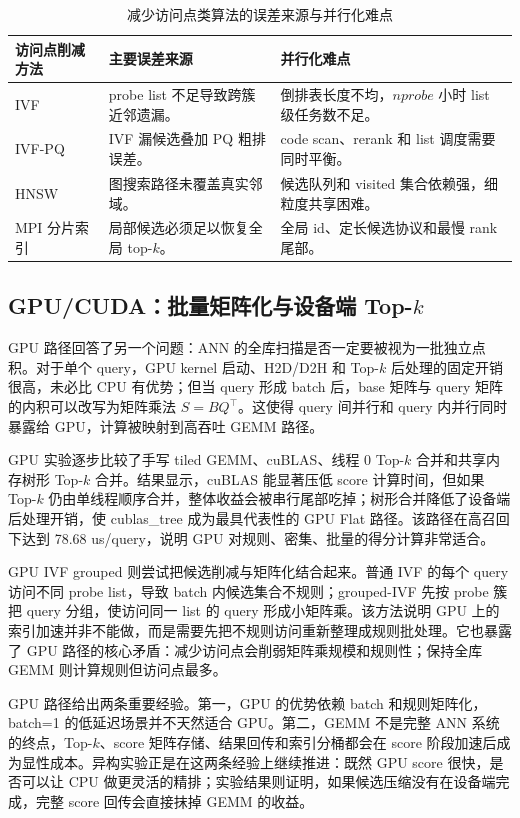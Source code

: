 \documentclass[a4paper,11pt,UTF8]{ctexart}
\begin{document}
\begin{table}[H]
  \centering\footnotesize
  \begin{tabularx}{\textwidth}{p{2.8cm}p{3.8cm}Y}
    \toprule
    访问点削减方法 & 主要误差来源 & 并行化难点 \\
    \midrule
    IVF & probe list 不足导致跨簇近邻遗漏。 & 倒排表长度不均，$nprobe$ 小时 list 级任务数不足。 \\
    IVF-PQ & IVF 漏候选叠加 PQ 粗排误差。 & code scan、rerank 和 list 调度需要同时平衡。 \\
    HNSW & 图搜索路径未覆盖真实邻域。 & 候选队列和 visited 集合依赖强，细粒度共享困难。 \\
    MPI 分片索引 & 局部候选必须足以恢复全局 top-$k$。 & 全局 id、定长候选协议和最慢 rank 尾部。 \\
    \bottomrule
  \end{tabularx}
  \caption{减少访问点类算法的误差来源与并行化难点}
  \label{tab:index-difficulty}
\end{table}

\subsection{GPU/CUDA：批量矩阵化与设备端 Top-$k$}

GPU 路径回答了另一个问题：ANN 的全库扫描是否一定要被视为一批独立点积。对于单个 query，GPU kernel 启动、H2D/D2H 和 Top-$k$ 后处理的固定开销很高，未必比 CPU 有优势；但当 query 形成 batch 后，base 矩阵与 query 矩阵的内积可以改写为矩阵乘法 $S=BQ^\top$。这使得 query 间并行和 query 内并行同时暴露给 GPU，计算被映射到高吞吐 GEMM 路径。

GPU 实验逐步比较了手写 tiled GEMM、cuBLAS、线程 0 Top-$k$ 合并和共享内存树形 Top-$k$ 合并。结果显示，cuBLAS 能显著压低 score 计算时间，但如果 Top-$k$ 仍由单线程顺序合并，整体收益会被串行尾部吃掉；树形合并降低了设备端后处理开销，使 cublas\_tree 成为最具代表性的 GPU Flat 路径。该路径在高召回下达到 78.68 us/query，说明 GPU 对规则、密集、批量的得分计算非常适合。

GPU IVF grouped 则尝试把候选削减与矩阵化结合起来。普通 IVF 的每个 query 访问不同 probe list，导致 batch 内候选集合不规则；grouped-IVF 先按 probe 簇把 query 分组，使访问同一 list 的 query 形成小矩阵乘。该方法说明 GPU 上的索引加速并非不能做，而是需要先把不规则访问重新整理成规则批处理。它也暴露了 GPU 路径的核心矛盾：减少访问点会削弱矩阵乘规模和规则性；保持全库 GEMM 则计算规则但访问点最多。

GPU 路径给出两条重要经验。第一，GPU 的优势依赖 batch 和规则矩阵化，batch=1 的低延迟场景并不天然适合 GPU。第二，GEMM 不是完整 ANN 系统的终点，Top-$k$、score 矩阵存储、结果回传和索引分桶都会在 score 阶段加速后成为显性成本。异构实验正是在这两条经验上继续推进：既然 GPU score 很快，是否可以让 CPU 做更灵活的精排；实验结果则证明，如果候选压缩没有在设备端完成，完整 score 回传会直接抹掉 GEMM 的收益。
\end{document}
